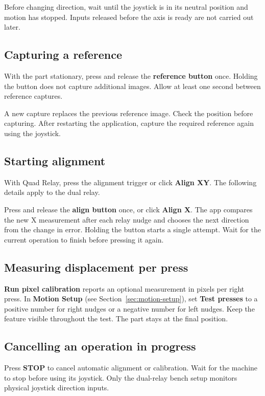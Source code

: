 \documentclass[a4paper,11pt]{article}
\newcommand{\ReferenceButton}{\textbf{reference button}}
\newcommand{\AlignButton}{\textbf{align button}}
\begin{document}
Before changing direction, wait until the joystick is in its neutral position
and motion has stopped. Inputs released before the axis is ready are not
carried out later.

\subsection{Capturing a reference}

With the part stationary, press and release the \ReferenceButton{} once.
Holding the button does not capture additional images. Allow at least one
second between reference captures.

A new capture replaces the previous reference image. Check the position
before capturing. After restarting the application, capture the required
reference again using the joystick.

\subsection{Starting alignment}

With Quad Relay, press the alignment trigger or click \textbf{Align XY}. The following details apply to the dual relay.

Press and release the \AlignButton{} once, or click \textbf{Align X}.
The app compares the new X measurement after each relay nudge and chooses
the next direction from the change in error. Holding the button starts a
single attempt. Wait for the current operation to finish before pressing it again.

\subsection{Measuring displacement per press}

\textbf{Run pixel calibration} reports an optional measurement in pixels per
right press. In \textbf{Motion Setup} (see Section~\ref{sec:motion-setup}),
set \textbf{Test presses} to a positive
number for right nudges or a negative number for left nudges. Keep the feature
visible throughout the test. The part stays at the final position.

\subsection{Cancelling an operation in progress}

Press \textbf{STOP} to cancel automatic alignment or calibration. Wait for the machine to stop before using its joystick. Only the dual-relay bench setup monitors physical joystick direction inputs.
\end{document}

